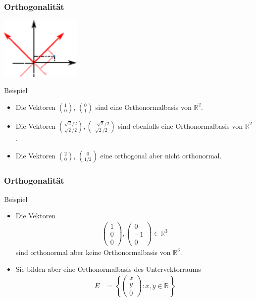 \documentclass{beamer}
\newcommand\RR{\mathbb R}
\newcommand\cbc[1]{\left\{{#1}\right\}}
\renewcommand{\ae}{\"a}
\newcommand{\mytitle}{Orthogonalit\ae t}
\begin{document}
\begin{frame}\frametitle{\mytitle}
	\hfill\includegraphics[height=30mm]{pics/basis.pdf}
	\begin{block}{Beispiel}
		\begin{itemize}
			\item Die Vektoren $\binom 10$, $\binom 01$ sind eine Orthonormalbasis von $\RR^2$.
			\item Die Vektoren $\binom{\sqrt 2/2}{\sqrt 2/2},\binom{-\sqrt 2/2}{\sqrt 2/2}$ sind ebenfalls eine Orthonormalbasis von $\RR^2$.
			\item Die Vektoren $\binom 20$, $\binom 0{1/2}$ eine orthogonal aber nicht orthonormal.
		\end{itemize}
	\end{block}
\end{frame}

\begin{frame}\frametitle{\mytitle}
	\begin{block}{Beispiel}
		\begin{itemize}
			\item Die Vektoren
				\begin{align*}
				\begin{pmatrix}1\\0\\0 \end{pmatrix},
				\begin{pmatrix}0\\-1\\0 \end{pmatrix}\in\RR^3
				\end{align*}
				sind orthonormal aber keine Orthonormalbasis von $\RR^3$.
			\item Sie bilden aber eine Orthonormalbasis des Untervektorraums
				\begin{align*}
					E&=\cbc{\begin{pmatrix}x\\y\\0\end{pmatrix}:x,y\in\RR}
				\end{align*}
		\end{itemize}
	\end{block}
\end{frame}
\end{document}
